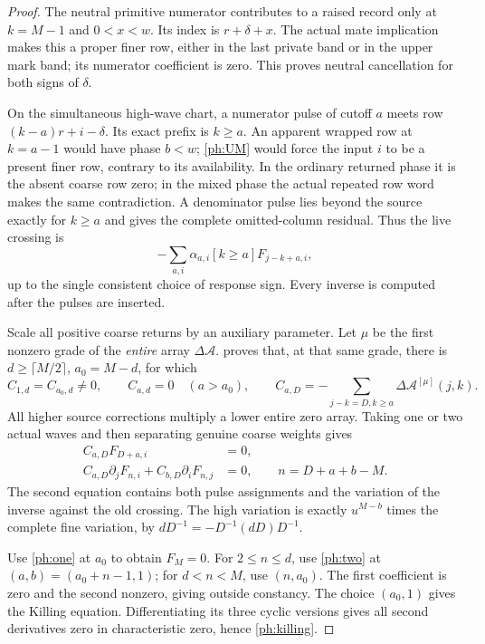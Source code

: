 \documentclass[11pt,a4paper]{amsart}
\numberwithin{equation}{section}
\theoremstyle{plain}
\theoremstyle{definition}
\begin{document}
\begin{proof}
The neutral primitive numerator contributes to a raised record only at
\(k=M-1\) and \(0<x<w\).  Its index is \(r+\delta+x\).
The actual mate implication makes this a proper finer row, either in the
last private band or in the upper mark band; its numerator coefficient
is zero.  This proves neutral cancellation for both signs of \(\delta\).

On the simultaneous high-wave chart, a numerator pulse of cutoff \(a\)
meets row \((k-a)r+i-\delta\).  Its exact prefix is \(k\ge a\).
An apparent wrapped row at \(k=a-1\) would have phase \(b<w\);
\eqref{ph:UM} would force the input \(i\) to be a present finer row,
contrary to its availability.  In the ordinary returned phase it is the
absent coarse row zero; in the mixed phase the actual repeated row word
makes the same contradiction.  A denominator pulse lies beyond the source
exactly for \(k\ge a\) and gives the complete omitted-column residual.
Thus the live crossing is
\[
 -\sum_{a,i}\alpha_{a,i}[k\ge a]F_{j-k+a,i},
\]
up to the single consistent choice of response sign.  Every inverse is
computed after the pulses are inserted.

Scale all positive coarse returns by an auxiliary parameter.  Let \(\mu\)
be the first nonzero grade of the \emph{entire} array
\(\Delta\mathcal A\).   proves that, at that same
grade, there is \(d\ge\lceil M/2\rceil\), \(a_0=M-d\), for which
\[
 C_{1,d}=C_{a_0,d}\ne0,\qquad C_{a,d}=0\quad(a>a_0),\qquad
 C_{a,D}=-\sum_{j-k=D,k\ge a}\Delta\mathcal A^{[\mu]}(j,k).
\]
All higher source corrections multiply a lower entire zero array.
Taking one or two actual waves and then separating genuine coarse weights
gives
\begin{align}
 C_{a,D}F_{D+a,i}&=0,\label{ph:one}\\
 C_{a,D}\partial_jF_{n,i}+C_{b,D}\partial_iF_{n,j}&=0,
 \qquad n=D+a+b-M.\label{ph:two}
\end{align}
The second equation contains both pulse assignments and the variation of
the inverse against the old crossing.  The high variation is exactly
\(u^{M-b}\) times the complete fine variation, by
\(dD^{-1}=-D^{-1}(dD)D^{-1}\).

Use \eqref{ph:one} at \(a_0\) to obtain \(F_M=0\).
For \(2\le n\le d\), use \eqref{ph:two} at
\((a,b)=(a_0+n-1,1)\); for \(d<n<M\), use \((n,a_0)\).
The first coefficient is zero and the second nonzero, giving outside
constancy.  The choice \((a_0,1)\) gives the Killing equation.
Differentiating its three cyclic versions gives all second derivatives
zero in characteristic zero, hence \eqref{ph:killing}.


\end{proof}
\end{document}
